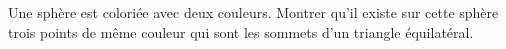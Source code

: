 Une sphère est coloriée avec deux couleurs. Montrer qu'il existe sur cette sphère trois points de même couleur qui sont les sommets d'un triangle équilatéral.
